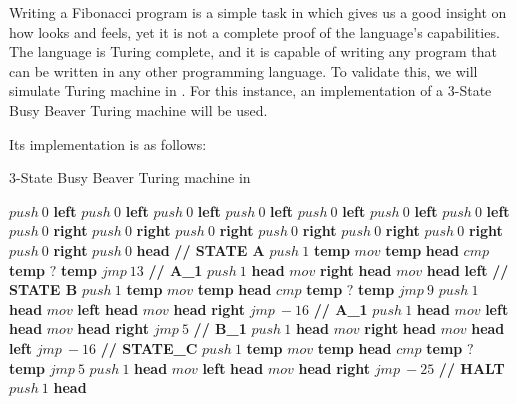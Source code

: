Writing a Fibonacci program is a simple task in \sculpt which gives us a good insight on how \sculpt looks and feels, yet it is not a complete proof of the language's capabilities.
The language is Turing complete, and it is capable of writing any program that can be written in any other programming language.
To validate this, we will simulate Turing machine in \sculpt.
For this instance, an implementation of a 3-State Busy Beaver Turing machine will be used.

Its \sculpter implementation is as follows:

\begin{algorithm}
    \caption{3-State Busy Beaver Turing machine in \sculpt}
    \label{alg:busybeaver}
    \begin{algorithmic}
    \State $push~0$ \textbf{left}
    \State $push~0$ \textbf{left}
    \State $push~0$ \textbf{left}
    \State $push~0$ \textbf{left}
    \State $push~0$ \textbf{left}
    \State $push~0$ \textbf{left}
    \State $push~0$ \textbf{left}
    \State
    \State $push~0$ \textbf{right}
    \State $push~0$ \textbf{right}
    \State $push~0$ \textbf{right}
    \State $push~0$ \textbf{right}
    \State $push~0$ \textbf{right}
    \State $push~0$ \textbf{right}
    \State $push~0$ \textbf{right}
    \State
    \State $push~0$ \textbf{head}
    \State
    \State \textbf{// STATE A}
    \State $push~1$ \textbf{temp}
    \State $mov$ \textbf{temp} \textbf{head}
    \State $cmp$ \textbf{temp}
    \State $?$ \textbf{temp}
    \State $jmp~13$ \textbf{// A\_1}
    \State $push~1$ \textbf{head}
    \State $mov$ \textbf{right} \textbf{head}
    \State $mov$ \textbf{head} \textbf{left}
    \State
    \State \textbf{// STATE B}
    \State $push~1$ \textbf{temp}
    \State $mov$ \textbf{temp} \textbf{head}
    \State $cmp$ \textbf{temp}
    \State $?$ \textbf{temp}
    \State $jmp~9$
    \State $push~1$ \textbf{head}
    \State $mov$ \textbf{left} \textbf{head}
    \State $mov$ \textbf{head} \textbf{right}
    \State $jmp~-16$
    \State
    \State \textbf{// A\_1}
    \State $push~1$ \textbf{head}
    \State $mov$ \textbf{left} \textbf{head}
    \State $mov$ \textbf{head} \textbf{right}
    \State $jmp~5$
    \State
    \State \textbf{// B\_1}
    \State $push~1$ \textbf{head}
    \State $mov$ \textbf{right} \textbf{head}
    \State $mov$ \textbf{head} \textbf{left}
    \State $jmp~-16$
    \State
    \State \textbf{// STATE\_C}
    \State $push~1$ \textbf{temp}
    \State $mov$ \textbf{temp} \textbf{head}
    \State $cmp$ \textbf{temp}
    \State $?$ \textbf{temp}
    \State $jmp~5$
    \State $push~1$ \textbf{head}
    \State $mov$ \textbf{left} \textbf{head}
    \State $mov$ \textbf{head} \textbf{right}
    \State $jmp~-25$
    \State
    \State \textbf{// HALT}
    \State $push~1$ \textbf{head}
    \end{algorithmic}
\end{algorithm}

